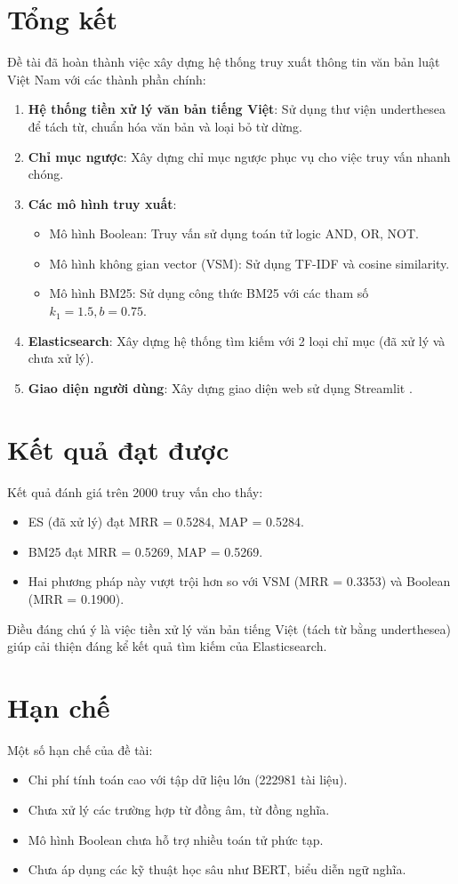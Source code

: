\documentclass[../BTL.tex]{subfiles}
\begin{document}
\section{Tổng kết}
Đề tài đã hoàn thành việc xây dựng hệ thống truy xuất thông tin văn bản luật Việt Nam với các thành phần chính:

\begin{enumerate}
    \item \textbf{Hệ thống tiền xử lý văn bản tiếng Việt}: Sử dụng thư viện underthesea \cite{underthesea} để tách từ, chuẩn hóa văn bản và loại bỏ từ dừng.
    \item \textbf{Chỉ mục ngược}: Xây dựng chỉ mục ngược phục vụ cho việc truy vấn nhanh chóng.
    \item \textbf{Các mô hình truy xuất}:
    \begin{itemize}
        \item Mô hình Boolean: Truy vấn sử dụng toán tử logic AND, OR, NOT.
        \item Mô hình không gian vector (VSM): Sử dụng TF-IDF và cosine similarity.
        \item Mô hình BM25: Sử dụng công thức BM25 với các tham số $k_1=1.5, b=0.75$.
    \end{itemize}
    \item \textbf{Elasticsearch}: Xây dựng hệ thống tìm kiếm với 2 loại chỉ mục (đã xử lý và chưa xử lý).
    \item \textbf{Giao diện người dùng}: Xây dựng giao diện web sử dụng Streamlit \cite{streamlit}.
\end{enumerate}

\section{Kết quả đạt được}
Kết quả đánh giá trên 2000 truy vấn cho thấy:
\begin{itemize}
    \item ES (đã xử lý) đạt MRR = 0.5284, MAP = 0.5284.
    \item BM25 đạt MRR = 0.5269, MAP = 0.5269.
    \item Hai phương pháp này vượt trội hơn so với VSM (MRR = 0.3353) và Boolean (MRR = 0.1900).
\end{itemize}

Điều đáng chú ý là việc tiền xử lý văn bản tiếng Việt (tách từ bằng underthesea) giúp cải thiện đáng kể kết quả tìm kiếm của Elasticsearch.

\section{Hạn chế}
Một số hạn chế của đề tài:
\begin{itemize}
    \item Chi phí tính toán cao với tập dữ liệu lớn (222981 tài liệu).
    \item Chưa xử lý các trường hợp từ đồng âm, từ đồng nghĩa.
    \item Mô hình Boolean chưa hỗ trợ nhiều toán tử phức tạp.
    \item Chưa áp dụng các kỹ thuật học sâu như BERT, biểu diễn ngữ nghĩa.
\end{itemize}
\end{document}
